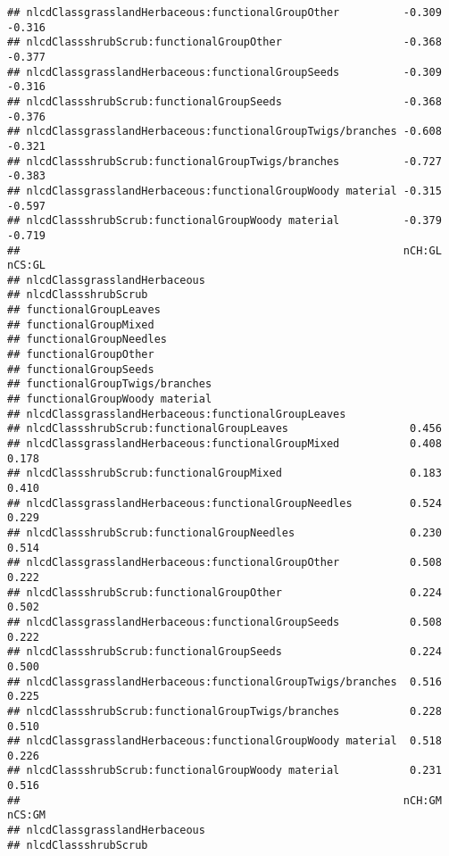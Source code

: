 \documentclass[]{article}
\begin{document}
\begin{verbatim}
## nlcdClassgrasslandHerbaceous:functionalGroupOther          -0.309 -0.316
## nlcdClassshrubScrub:functionalGroupOther                   -0.368 -0.377
## nlcdClassgrasslandHerbaceous:functionalGroupSeeds          -0.309 -0.316
## nlcdClassshrubScrub:functionalGroupSeeds                   -0.368 -0.376
## nlcdClassgrasslandHerbaceous:functionalGroupTwigs/branches -0.608 -0.321
## nlcdClassshrubScrub:functionalGroupTwigs/branches          -0.727 -0.383
## nlcdClassgrasslandHerbaceous:functionalGroupWoody material -0.315 -0.597
## nlcdClassshrubScrub:functionalGroupWoody material          -0.379 -0.719
##                                                            nCH:GL nCS:GL
## nlcdClassgrasslandHerbaceous                                            
## nlcdClassshrubScrub                                                     
## functionalGroupLeaves                                                   
## functionalGroupMixed                                                    
## functionalGroupNeedles                                                  
## functionalGroupOther                                                    
## functionalGroupSeeds                                                    
## functionalGroupTwigs/branches                                           
## functionalGroupWoody material                                           
## nlcdClassgrasslandHerbaceous:functionalGroupLeaves                      
## nlcdClassshrubScrub:functionalGroupLeaves                   0.456       
## nlcdClassgrasslandHerbaceous:functionalGroupMixed           0.408  0.178
## nlcdClassshrubScrub:functionalGroupMixed                    0.183  0.410
## nlcdClassgrasslandHerbaceous:functionalGroupNeedles         0.524  0.229
## nlcdClassshrubScrub:functionalGroupNeedles                  0.230  0.514
## nlcdClassgrasslandHerbaceous:functionalGroupOther           0.508  0.222
## nlcdClassshrubScrub:functionalGroupOther                    0.224  0.502
## nlcdClassgrasslandHerbaceous:functionalGroupSeeds           0.508  0.222
## nlcdClassshrubScrub:functionalGroupSeeds                    0.224  0.500
## nlcdClassgrasslandHerbaceous:functionalGroupTwigs/branches  0.516  0.225
## nlcdClassshrubScrub:functionalGroupTwigs/branches           0.228  0.510
## nlcdClassgrasslandHerbaceous:functionalGroupWoody material  0.518  0.226
## nlcdClassshrubScrub:functionalGroupWoody material           0.231  0.516
##                                                            nCH:GM nCS:GM
## nlcdClassgrasslandHerbaceous                                            
## nlcdClassshrubScrub                                                     

\end{verbatim}
\end{document}
